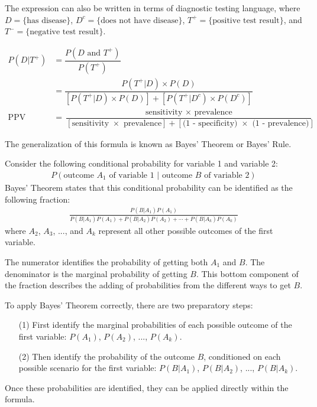 The expression can also be written in terms of diagnostic testing language, where $D = \text{\{has disease\}}$, $D^c = \text{\{does not have disease\}}$, $T^{+} = \text{\{positive test result\}}$, and $T^{-} = \text{\{negative test result\}}$.

\begin{align*}
P(D|T^{+}) &= \dfrac{P(D \text{ and } T^{+})}{P(T^{+})} \\
&= \dfrac{P(T^{+}|D) \times P(D)}{[P(T^{+}|D) \times P(D)] + [P(T^{+}|D^c) \times P(D^c)]} \\
\text{PPV} &= \dfrac{\text{sensitivity } \times \text{ prevalence}}{[\text{sensitivity } \times \text{ prevalence}] + [\text{(1 - specificity) } \times \text{ (1 - prevalence)}]}
\end{align*}

The generalization of this formula is known as Bayes' Theorem or Bayes' Rule.

\begin{termBox}{
Consider the following conditional probability for variable 1 and variable 2:\vspace{-1.5mm}
\begin{align*}
P(\text{outcome $A_1$ of variable 1 } | \text{ outcome $B$ of variable 2})
\end{align*}
Bayes' Theorem states that this conditional probability can be identified as the following fraction:\vspace{-1.5mm}
\begin{align}
\frac{P(B | A_1) P(A_1)}
	{P(B | A_1) P(A_1) + P(B | A_2) P(A_2) + \cdots + P(B | A_k) P(A_k)}
	\label{equationOfBayesTheorem}
\end{align}
where $A_2$, $A_3$, ..., and $A_k$ represent all other possible outcomes of the first variable.}
\end{termBox}

The numerator identifies the probability of getting both $A_1$ and $B$. The denominator is the marginal probability of getting $B$. This bottom component of the fraction describes the adding of probabilities from the different ways to get $B$. 

To apply Bayes' Theorem correctly, there are two preparatory steps:
\begin{enumerate}
\setlength{\itemsep}{0mm}
\item[(1)] First identify the marginal probabilities of each possible outcome of the first variable: $P(A_1)$, $P(A_2)$, ..., $P(A_k)$.
\item[(2)] Then identify the probability of the outcome $B$, conditioned on each possible scenario for the first variable: $P(B | A_1)$, $P(B | A_2)$, ..., $P(B | A_k)$.
\end{enumerate}
Once these probabilities are identified, they can be applied directly within the formula.

